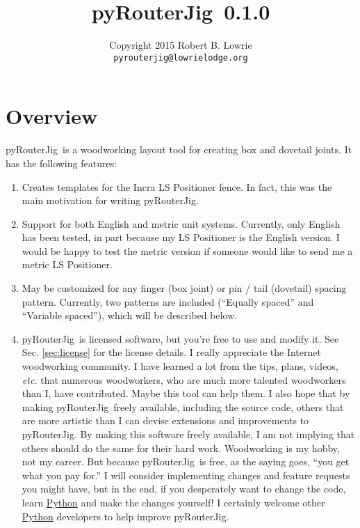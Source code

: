 \documentclass[12pt,final]{article}
\makeatletter
\newcommand{\codename}[0]{pyRouterJig}
\newcommand{\codever}[0]{{\codename~0.1.0}}
\newcommand{\email}[0]{\texttt{pyrouterjig@lowrielodge.org}}
\newcommand{\mycopyright}[0]{{Copyright 2015 Robert B. Lowrie}}
\makeatother
\begin{document}
\title{\codever}
\author{\mycopyright \\ \email}
\date{}
\maketitle

\section{Overview}

\codename~is a woodworking layout tool for creating box and dovetail
joints.  It has the following features:
\begin{enumerate}
\item Creates templates for the Incra LS Positioner fence.  In fact, this was
  the main motivation for writing \codename.
\item Support for both English and metric unit systems.  Currently, only
  English has been tested, in part because my LS Positioner is the English
  version.  I would be happy to test the metric version if someone would like
  to send me a metric LS Positioner.
\item May be customized for any finger (box joint) or pin / tail (dovetail)
  spacing pattern.  Currently, two patterns are included (``Equally spaced''
  and ``Variable spaced''), which will be described below.
\item \codename~is licensed software, but you're free to use and modify it.
  See Sec. \ref{sec:license} for the license details.  I really appreciate the
  Internet woodworking community.  I have learned a lot from the tips, plans,
  videos, \emph{etc.} that numerous woodworkers, who are much more talented
  woodworkers than I, have contributed.  Maybe this tool can help them.  I
  also hope that by making \codename~freely available, including the source
  code, others that are more artistic than I can devise extensions and
  improvements to \codename.  By making this software freely available, I am
  not implying that others should do the same for their hard work. 
   Woodworking is my hobby, not my career.  But because
  \codename~is free, as the saying goes, ``you get what you pay for.''  I will
  consider implementing changes and feature requests you might have, but in
  the end, if you desperately want to change the code, learn
  \href{http://www.python.org}{Python} and make the changes yourself!  I
  certainly welcome other \href{http://www.python.org}{Python} developers to
  help improve \codename.
\end{enumerate}
\end{document}
